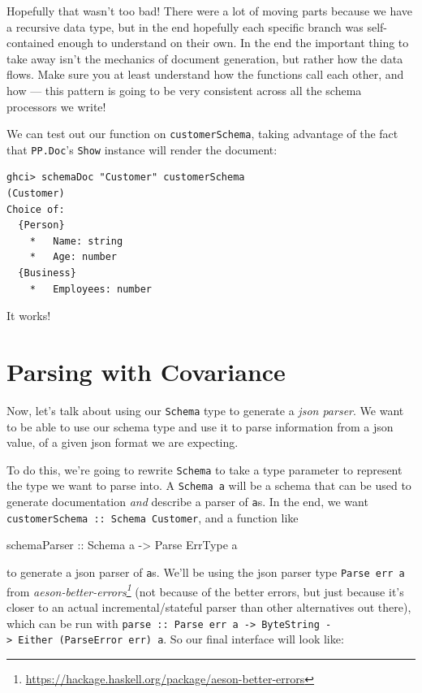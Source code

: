 \documentclass[]{article}
\newenvironment{Shaded}{}{}
\newcommand{\DataTypeTok}[1]{\textcolor[rgb]{0.56,0.13,0.00}{#1}}
\newcommand{\NormalTok}[1]{#1}
\newcommand{\OtherTok}[1]{\textcolor[rgb]{0.00,0.44,0.13}{#1}}
\renewcommand{\href}[2]{#2\footnote{\url{#1}}}
\begin{document}
Hopefully that wasn't too bad! There were a lot of moving parts because we have
a recursive data type, but in the end hopefully each specific branch was
self-contained enough to understand on their own. In the end the important thing
to take away isn't the mechanics of document generation, but rather how the data
flows. Make sure you at least understand how the functions call each other, and
how --- this pattern is going to be very consistent across all the schema
processors we write!

We can test out our function on \texttt{customerSchema}, taking advantage of the
fact that \texttt{PP.Doc}'s \texttt{Show} instance will render the document:

\begin{verbatim}
ghci> schemaDoc "Customer" customerSchema
(Customer)
Choice of:
  {Person}
    *   Name: string
    *   Age: number
  {Business}
    *   Employees: number
\end{verbatim}

It works!

\section{Parsing with Covariance}\label{parsing-with-covariance}

Now, let's talk about using our \texttt{Schema} type to generate a \emph{json
parser}. We want to be able to use our schema type and use it to parse
information from a json value, of a given json format we are expecting.

To do this, we're going to rewrite \texttt{Schema} to take a type parameter to
represent the type we want to parse into. A \texttt{Schema\ a} will be a schema
that can be used to generate documentation \emph{and} describe a parser of
\texttt{a}s. In the end, we want \texttt{customerSchema\ ::\ Schema\ Customer},
and a function like

\begin{Shaded}
\begin{Highlighting}[]
\OtherTok{schemaParser ::} \DataTypeTok{Schema}\NormalTok{ a }\OtherTok{{-}\textgreater{}} \DataTypeTok{Parse} \DataTypeTok{ErrType}\NormalTok{ a}
\end{Highlighting}
\end{Shaded}

to generate a json parser of \texttt{a}s. We'll be using the json parser type
\texttt{Parse\ err\ a} from
\emph{\href{https://hackage.haskell.org/package/aeson-better-errors}{aeson-better-errors}}
(not because of the better errors, but just because it's closer to an actual
incremental/stateful parser than other alternatives out there), which can be run
with
\texttt{parse\ ::\ Parse\ err\ a\ -\textgreater{}\ ByteString\ -\textgreater{}\ Either\ (ParseError\ err)\ a}.
So our final interface will look like:
\end{document}
